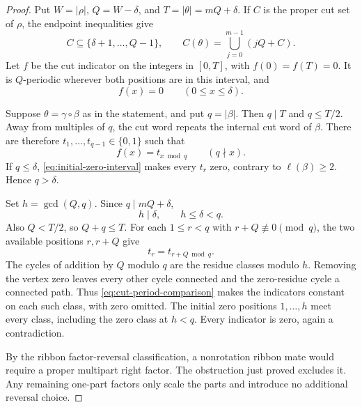 \documentclass[11pt,a4paper]{amsart}
\numberwithin{equation}{section}
\theoremstyle{plain}
\theoremstyle{definition}
\begin{document}
\begin{proof}
Put \(W=|\rho|\), \(Q=W-\delta\), and
\(T=|\theta|=mQ+\delta\).  If \(C\) is the proper cut set of
\(\rho\), the endpoint inequalities give
\begin{equation}\label{eq:overlap-cut-set}
 C\subseteq\{\delta+1,\ldots,Q-1\},\qquad
 C(\theta)=\bigcup_{j=0}^{m-1}(jQ+C).
\end{equation}
Let \(f\) be the cut indicator on the integers in \([0,T]\), with
\(f(0)=f(T)=0\).  It is \(Q\)-periodic wherever both positions are
in this interval, and
\begin{equation}\label{eq:initial-zero-interval}
 f(x)=0\qquad(0\le x\le\delta).
\end{equation}

Suppose \(\theta=\gamma\circ\beta\) as in the statement, and put
\(q=|\beta|\).  Then \(q\mid T\) and \(q\le T/2\).
Away from multiples of \(q\), the cut word repeats the internal cut
word of \(\beta\).  There are therefore
\(t_1,\ldots,t_{q-1}\in\{0,1\}\) such that
\[
 f(x)=t_{x\bmod q}\qquad(q\nmid x).
\]
If \(q\le\delta\), \eqref{eq:initial-zero-interval} makes every
\(t_r\) zero, contrary to \(\ell(\beta)\ge2\).  Hence
\(q>\delta\).

Set \(h=\gcd(Q,q)\).  Since \(q\mid mQ+\delta\),
\begin{equation}\label{eq:period-gcd}
 h\mid\delta,\qquad h\le\delta<q.
\end{equation}
Also \(Q<T/2\), so \(Q+q\le T\).  For each
\(1\le r<q\) with \(r+Q\not\equiv0\pmod q\), the two
available positions \(r,r+Q\) give
\begin{equation}\label{eq:cut-period-comparison}
 t_r=t_{r+Q\bmod q}.
\end{equation}
The cycles of addition by \(Q\) modulo \(q\) are the residue
classes modulo \(h\).  Removing the vertex zero leaves every other
cycle connected and the zero-residue cycle a connected path.
Thus \eqref{eq:cut-period-comparison} makes the indicators constant on
each such class, with zero omitted.  The initial zero positions
\(1,\ldots,h\) meet every class, including the zero class at
\(h<q\).  Every indicator is zero, again a contradiction.

By the ribbon factor-reversal classification, a nonrotation ribbon mate
would require a proper multipart right factor.  The obstruction just
proved excludes it.  Any remaining one-part factors only scale the parts
and introduce no additional reversal choice.
\end{proof}
\end{document}
